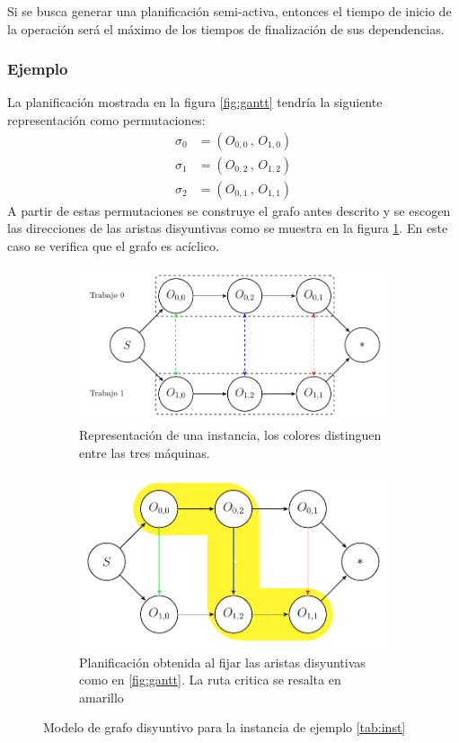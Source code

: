 Si se busca generar una planificación semi-activa, entonces el tiempo de inicio de la operación será el máximo de los tiempos de finalización de sus dependencias.

\subsubsection*{Ejemplo}
La planificación mostrada en la figura \ref{fig:gantt} tendría la siguiente representación como permutaciones:
\begin{align*}
\sigma_0 &= (O_{0,0}\,,\,O_{1,0})\\
\sigma_1 &= (O_{0,2}\,,\,O_{1,2})\\
\sigma_2 &= (O_{0,1}\,,\,O_{1,1})
\end{align*}
A partir de estas permutaciones se construye el grafo antes descrito y se escogen las direcciones de las aristas disyuntivas como se muestra en la figura \ref{fig:dgraph}. En este caso se verifica que el grafo es acíclico. 
\begin{figure}[h]
    \centering
    \begin{subfigure}{.8\textwidth}
        \centering
        \includegraphics[width=.8\linewidth]{Imagenes/disyuntive.pdf}
        \caption{Representación de una instancia, los colores distinguen entre las tres máquinas.}
    \end{subfigure}
    \begin{subfigure}{.8\textwidth}
        \centering
        \includegraphics[width=.8\linewidth]{Imagenes/plandisyuntive.pdf}
        \caption{Planificación obtenida al fijar las aristas disyuntivas como en \ref{fig:gantt}. La ruta critica se resalta en amarillo}
    \end{subfigure}
\caption{Modelo de grafo disyuntivo para la instancia de ejemplo \ref{tab:inst}}
        \label{fig:dgraph}
\end{figure}

